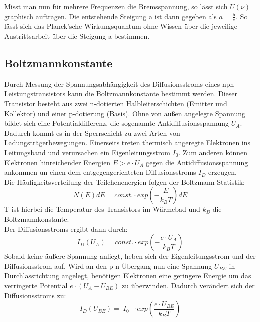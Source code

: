 \documentclass[a4paper,10pt,twocolumn]{scrartcl} %
\begin{document}
		Misst man nun für mehrere Frequenzen die Bremsspannung, so lässt sich $U(\nu)$ graphisch auftragen.
		Die entstehende Steigung a ist dann gegeben als $a = \frac{\textit{h}}{\textit{e}}$. So lässt sich das Planck'sche Wirkungsquantum
		ohne Wissen über die jeweilige Austrittsarbeit über die Steigung a bestimmen.

	\subsection{Boltzmannkonstante}

		Durch Messung der Spannungsabhängigkeit des Diffusionsstroms eines npn-Leistungstransistors kann die Boltzmannkonstante 
		bestimmt werden. Dieser Transistor besteht aus zwei n-dotierten Halbleiterschichten (Emitter und Kollektor) und einer
		p-dotierung (Basis). Ohne von außen angelegte Spannung bildet sich eine Potentialdifferenz, die sogenannte
		Antidiffusionsspannung $U_A$. Dadurch kommt es in der Sperrschicht zu zwei Arten von Ladungsträgerbewegungen. Einerseits
		treten thermisch angeregte Elektronen ins Leitungsband und verursachen ein Eigenleitungsstrom $I_0$. Zum anderen können
		Elektronen hinreichender Energien $E > \textit{e} \cdot U_A$ gegen die Antidiffusionsspannung ankommen un einen dem entgegengerichteten
		Diffusionsstroms $I_D$ erzeugen. \\
		Die Häufigkeitsverteilung der Teilchenenergien folgen der Boltzmann-Statistik:
		\begin{equation*}
			N(E)dE = const. \cdot exp(-\frac{E}{k_BT})dE
		\label{BesetzteZustaende}
		\end{equation*}
		T ist hierbei die Temperatur des Transistors im Wärmebad und \textit{$k_B$} die Boltzmannkonstante.\\
		Der Diffusionsstroms ergibt dann durch:
		\begin{equation*}	
			I_D(U_A) = const. \cdot exp(-\frac{\textit{e} \cdot U_A}{k_B T})
		\label{Diffusionsstrom1}
		\end{equation*}
		Sobald keine äußere Spannung anliegt, heben sich der Eigenleitungsstrom und der Diffusionsstrom auf.
		Wird an den p-n-Übergang nun eine Spannung $U_{BE}$ in Durchlassrichtung angelegt, benötigen Elektronen eine geringere Energie um
		das verringerte Potential $\textit{e} \cdot (U_A-U_{BE})$ zu überwinden. Dadurch verändert sich der Diffusionsstroms zu:
		\begin{equation*}
			I_D(U_{BE}) = \mid I_0 \mid \cdot exp(\frac{e \cdot U_{BE}}{k_B T})
		\label{Diffusionsstrom2}
		\end{equation*}
\end{document}

